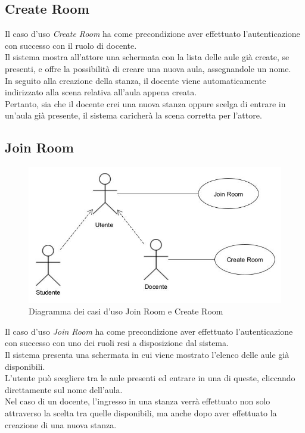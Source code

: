 \subsection{Create Room}
Il caso d'uso \textit{Create Room} ha come precondizione aver effettuato l'autenticazione con successo con il ruolo di docente.
\\Il sistema mostra all'attore una schermata con la lista delle aule già create, se presenti, e offre la possibilità di creare una nuova aula, assegnandole un nome. \\In seguito alla creazione della stanza, il docente viene automaticamente indirizzato alla scena relativa all'aula appena creata.\\Pertanto, sia che il docente crei una nuova stanza oppure scelga di entrare in un'aula già presente, il sistema caricherà la scena corretta per l'attore.
\subsection{Join Room}
\begin{figure}[H]
    \centering
    \includegraphics[scale=0.6]{Immagini/CreateJoinRoomUseCase.jpg}
    \caption{Diagramma dei casi d'uso Join Room e Create Room}
    \label{fig:my_label}
\end{figure}
Il caso d'uso \textit{Join Room} ha come precondizione aver effettuato l'autenticazione con successo con uno dei ruoli resi a disposizione dal sistema.
\\Il sistema presenta una schermata in cui viene mostrato l'elenco delle aule già disponibili. \\L'utente può scegliere tra le aule presenti ed entrare in una di queste, cliccando direttamente sul nome dell'aula.
\\Nel caso di un docente, l'ingresso in una stanza verrà effettuato non solo attraverso la scelta tra quelle disponibili, ma anche dopo aver effettuato la creazione di una nuova stanza.

